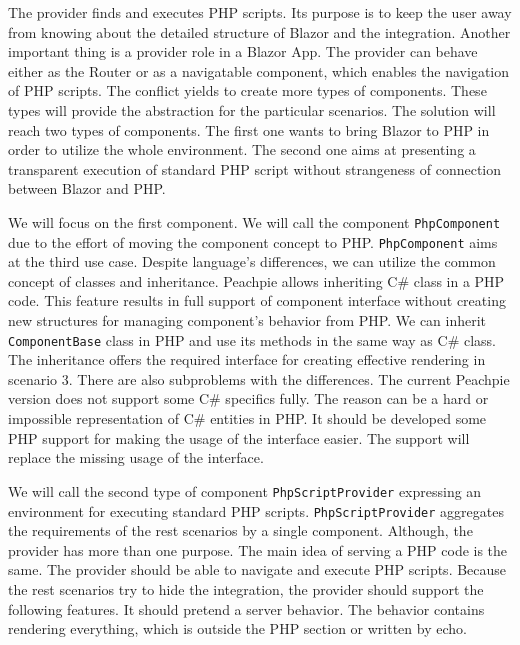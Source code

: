 The provider finds and executes PHP scripts.
Its purpose is to keep the user away from knowing about the detailed structure of Blazor and the integration.
Another important thing is a provider role in a Blazor App.
The provider can behave either as the Router or as a navigatable component, which enables the navigation of PHP scripts.
The conflict yields to create more types of components.
These types will provide the abstraction for the particular scenarios.
The solution will reach two types of components.
The first one wants to bring Blazor to PHP in order to utilize the whole environment.
The second one aims at presenting a transparent execution of standard PHP script without strangeness of connection between Blazor and PHP.
\par
We will focus on the first component.
We will call the component \texttt{PhpComponent} due to the effort of moving the component concept to PHP.
\texttt{PhpComponent} aims at the third use case.
Despite language's differences, we can utilize the common concept of classes and inheritance.
Peachpie allows inheriting C\# class in a PHP code.
This feature results in full support of component interface without creating new structures for managing component's behavior from PHP.
We can inherit \texttt{ComponentBase} class in PHP and use its methods in the same way as C\# class.
The inheritance offers the required interface for creating effective rendering in scenario 3.
There are also subproblems with the differences.
The current Peachpie version does not support some C\# specifics fully.
The reason can be a hard or impossible representation of C\# entities in PHP.
It should be developed some PHP support for making the usage of the interface easier.
The support will replace the missing usage of the interface.
\par
We will call the second type of component \texttt{PhpScriptProvider} expressing an environment for executing standard PHP scripts.
\texttt{PhpScriptProvider} aggregates the requirements of the rest scenarios by a single component.
Although, the provider has more than one purpose.
The main idea of serving a PHP code is the same.
The provider should be able to navigate and execute PHP scripts.
Because the rest scenarios try to hide the integration, the provider should support the following features.
It should pretend a server behavior.
The behavior contains rendering everything, which is outside the PHP section or written by echo.
